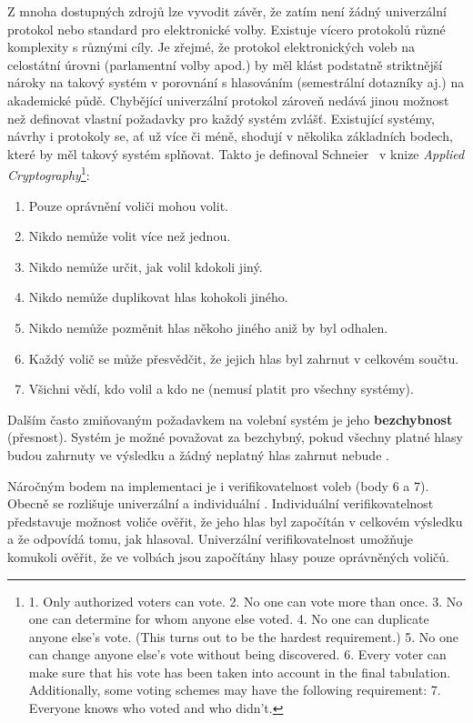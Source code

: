 \label{section:pozadavky}
Z mnoha dostupných zdrojů lze vyvodit závěr, že zatím není žádný univerzální protokol nebo standard pro elektronické volby. Existuje vícero protokolů různé komplexity s různými cíly. Je zřejmé, že protokol elektronických voleb na celostátní úrovni (parlamentní volby apod.) by měl klást podstatně striktnější nároky na takový systém v porovnání s hlasováním (semestrální dotazníky aj.)  na akademické půdě. Chybějící univerzální protokol zároveň nedává jinou možnost než definovat vlastní požadavky pro každý systém zvlášť.
\clearpage
Existující systémy, návrhy i protokoly se, ať už více či méně, shodují v několika základních bodech, které by měl takový systém splňovat. Takto je definoval Schneier~\cite{Schneier1996} v knize \textit{Applied Cryptography}\footnote{
1. Only authorized voters can vote.
2. No one can vote more than once.
3. No one can determine for whom anyone else voted.
4. No one can duplicate anyone else’s vote. (This turns out to be the
hardest requirement.)
5. No one can change anyone else’s vote without being discovered.
6. Every voter can make sure that his vote has been taken into account
in the final tabulation.
Additionally, some voting schemes may have the following requirement:
7. Everyone knows who voted and who didn’t.\cite{Schneier1996}
}:
\begin{enumerate}
	\item Pouze oprávnění voliči mohou volit.
	\item Nikdo nemůže volit více než jednou.
	\item Nikdo nemůže určit, jak volil kdokoli jiný.
	\item Nikdo nemůže duplikovat hlas kohokoli jiného.
	\item Nikdo nemůže pozměnit hlas někoho jiného aniž by byl odhalen.
	\item Každý volič se může přesvědčit, že jejich hlas byl zahrnut v celkovém součtu.
	\item Všichni vědí, kdo volil a kdo ne (nemusí platit pro všechny systémy).
\end{enumerate}


Dalším často zmiňovaným požadavkem na volební systém je jeho \textbf{bezchybnost} (přesnost). Systém je možné považovat za bezchybný, pokud všechny platné hlasy budou zahrnuty ve výsledku a žádný neplatný hlas zahrnut nebude \cite{4285237}\cite{QADAH2007376}\cite{10.1007/978-3-642-03315-5_13}.

Náročným bodem na implementaci je i verifikovatelnost voleb (body 6 a 7). Obecně se rozlišuje univerzální a individuální \cite{4285237}\cite{10.1007/978-3-642-03315-5_13}. Individuální verifikovatelnost představuje možnost voliče ověřit, že jeho hlas byl započítán v celkovém výsledku a že odpovídá tomu, jak hlasoval. Univerzální verifikovatelnost umožňuje komukoli ověřit, že ve volbách jsou započítány hlasy pouze oprávněných voličů.

